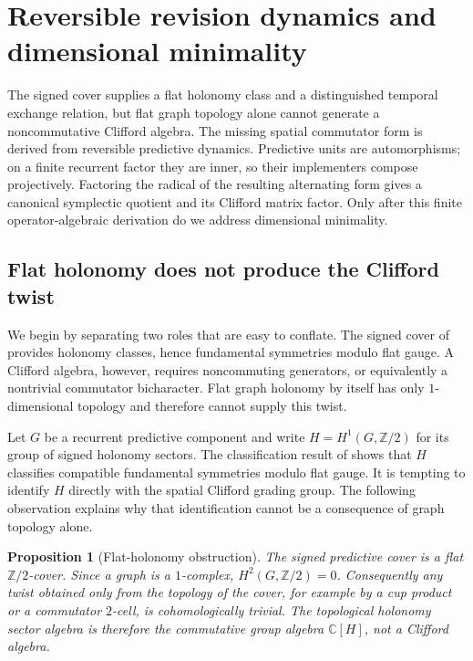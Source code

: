 \documentclass[11pt]{article}
\newtheorem{proposition}[theorem]{Proposition}
\theoremstyle{definition}
\theoremstyle{remark}
\newcommand{\Z}{\mathbb{Z}}
\newcommand{\C}{\mathbb{C}}
\begin{document}
\section{Reversible revision dynamics and dimensional minimality}
\label{sec:primitive-dimension-selection}

The signed cover supplies a flat holonomy class and a distinguished temporal
exchange relation, but flat graph topology alone cannot generate a
noncommutative Clifford algebra.  The missing spatial commutator form is derived
from reversible predictive dynamics.  Predictive units are automorphisms; on a
finite recurrent factor they are inner, so their implementers compose
projectively.  Factoring the radical of the resulting alternating form gives a
canonical symplectic quotient and its Clifford matrix factor.  Only after this
finite operator-algebraic derivation do we address dimensional minimality.

\subsection{Flat holonomy does not produce the Clifford twist}
\label{subsec:flat-holonomy-no-go}

We begin by separating two roles that are easy to conflate.  The signed cover
of  provides holonomy classes, hence fundamental symmetries
modulo flat gauge.  A Clifford algebra, however, requires noncommuting
generators, or equivalently a nontrivial commutator bicharacter.  Flat graph
holonomy by itself has only \(1\)-dimensional topology and therefore cannot
supply this twist.

Let \(G\) be a recurrent predictive component and write
\(H=H^1(G,\Z/2)\) for its group of signed holonomy sectors.  The classification
result of  shows that \(H\) classifies compatible
fundamental symmetries modulo flat gauge.  It is tempting to identify \(H\)
directly with the spatial Clifford grading group.  The following observation
explains why that identification cannot be a consequence of graph topology
alone.

\begin{proposition}[Flat-holonomy obstruction]
\label{prop:flat-holonomy-obstruction}
The signed predictive cover is a flat \(\Z/2\)-cover.  Since a graph is a
\(1\)-complex, \(H^2(G,\Z/2)=0\).  Consequently any twist obtained only from the
topology of the cover, for example by a cup product or a commutator \(2\)-cell,
is cohomologically trivial.  The topological holonomy sector algebra is
therefore the commutative group algebra \(\C[H]\), not a Clifford algebra.
\end{proposition}
\end{document}
